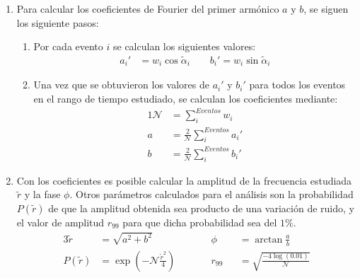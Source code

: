 \begin{enumerate}
        \item Para calcular los coeficientes de Fourier del primer armónico $a$ y $b$, se siguen los siguiente pasos:
        \begin{enumerate}
          \item Por cada evento  $i$ se calculan los siguientes valores:
          \begin{align}
             a_i' &= {w_i}\cos\tilde{\alpha}_i \qquad         b_i' = {w_i}\sin\tilde{\alpha}_i
         \end{align}
         \item Una vez que se obtuvieron los valores de $a_i'$ y $b_i'$ para todos los eventos en el rango de tiempo estudiado, se calculan los coeficientes mediante:
         \begin{alignat}{1}
          \mathcal{N} &= \sum^{Eventos}_i w_i \\
            a &= \frac{2}{\mathcal{N}} \sum^{Eventos}_i a_i' \\
            b &= \frac{2}{\mathcal{N}} \sum^{Eventos}_i b_i'  
         \end{alignat}
        \end{enumerate}
        \item Con los coeficientes es posible calcular la amplitud de la frecuencia estudiada $\tilde{r}$ y la fase $\phi$. Otros parámetros calculados para el análisis son la probabilidad $P(\tilde{r})$ de que la amplitud obtenida sea producto de una variación de ruido, y el valor de amplitud $r_{99}$ para que dicha probabilidad sea del $1$\%. 
        \begin{alignat}{3}
            \tilde{r} &= \sqrt{a^2 +b^2}             
            &&\phi&&= \arctan\frac{a}{b}\\
            P(\tilde{r})&= \exp(-\mathcal{N}\frac{\tilde{r}^2}{4}) \qquad
            &&r_{99}&&= \sqrt{\frac{-4\log(0.01)}{\mathcal{N}}}
        \end{alignat}

      \end{enumerate}